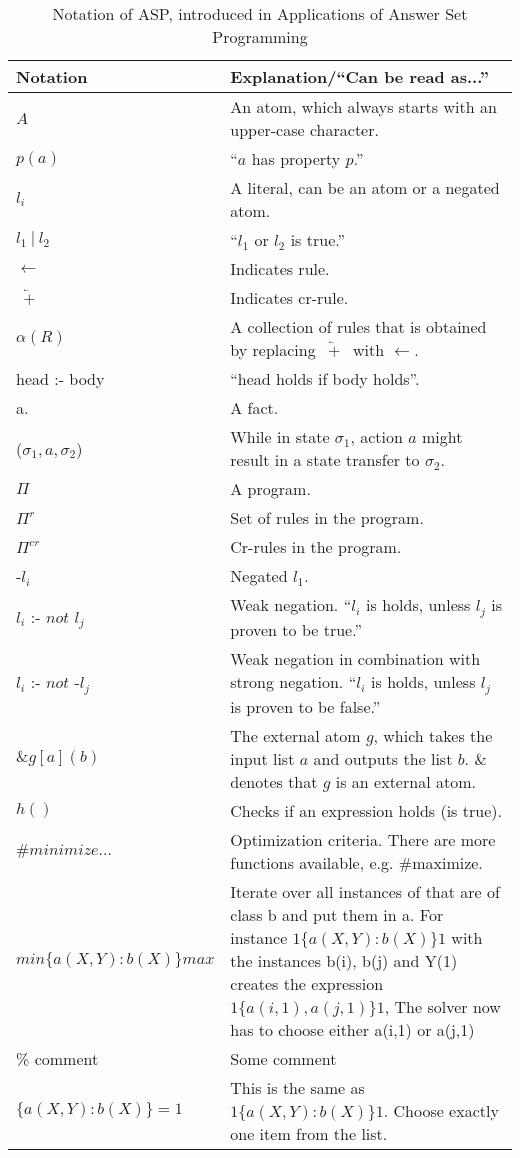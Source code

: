 \documentclass[runningheads]{llncs}
\newcommand{\papertitle}{Applications of Answer Set Programming}
\begin{document}
\begin{table}[t]
 \caption{Notation of ASP, introduced in \papertitle}
\label{table:notation}
\centering
 \begin{tabular}{|| l | @{}p{8.5cm}@{} ||}
 \hline
 Notation & Explanation/``Can be read as...'' \\ 
 \hline\hline
 $A$ & An atom, which always starts with an upper-case character. \\
 $p(a)$ & ``$a$ has property $p$.'' \\
 $l_i$ & A literal, can be an atom or a negated atom. \\
 $l_1 ~ | ~ l_2$ & ``$l_1$ or $l_2$ is true.'' \\
 $\leftarrow$ & Indicates rule. \\
 $\underleftarrow{~+~}$ & Indicates cr-rule. \\
$\alpha(R)$ & A collection of rules that  is obtained by replacing $\underleftarrow{~+~}$  with $\leftarrow$. \\
head :- body & ``head holds if body holds''. \\ 
a. & A fact. \\
($\sigma_1, a, \sigma_2$) & While in state $\sigma_1$, action $a$ might result in a state transfer to  $\sigma_2$. \\
$\Pi$  & A program. \\
$\Pi^r$ & Set of rules in the program. \\
$\Pi^{cr}$ & Cr-rules in the program. \\
-$l_i$ & Negated $l_1$. \\
$l_i$  :-  $not$  $l_j$ & Weak negation. ``$l_i$ is holds, unless $l_j$ is proven to be true.'' \\
$l_i$  :-  $not$ -$l_j$ & Weak negation in combination with strong negation. ``$l_i$ is holds, unless $l_j$ is proven to be false.'' \\
$\&g[a](b)$ & The external atom $g$, which takes the input list $a$ and outputs the list $b$. $\&$ denotes that $g$ is an external atom. \\
$h()$ & Checks if an expression holds (is true). \\
$\#minimize{...}$ & Optimization criteria. There are more functions available, e.g. \#maximize.  \\ %
$min\{a(X,Y) : b(X)\}max$ & Iterate over all instances of that are of class b and put them in a. For instance $1\{a(X,Y):b(X)\}1$ with the instances b(i), b(j) and Y(1) creates the expression $1\{a(i,1), a(j,1)\}1$, The solver now has to choose either a(i,1) or a(j,1)\\
\% comment & Some comment \\
$\{a(X,Y) : b(X)\} = 1$ & This is the same as $1\{a(X,Y) : b(X)\}1$. Choose exactly one item from the list.  \\
 \hline
 \end{tabular}
\end{table}
\end{document}
